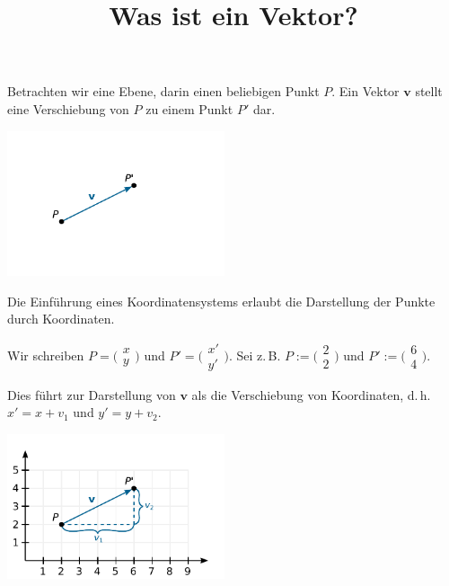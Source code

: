 \documentclass[9pt]{beamer}
\title{Was ist ein Vektor?}
\date{}
\newcommand{\bv}[1]{\mathbf{#1}}
\newcommand{\icol}[1]{
  \big(\!\begin{smallmatrix}#1\end{smallmatrix}\!\big)%
}
\newcommand{\parspace}{\vspace{0.8em}}
\begin{document}
\begin{frame}
\maketitle
\end{frame}

\begin{frame}
Betrachten wir eine Ebene, darin einen beliebigen Punkt $P$. Ein
Vektor $\bv v$ stellt eine Verschiebung von $P$ zu einem Punkt $P'$
dar.\pause

\vspace{-1em}
\begin{center}
\includegraphics[width=64mm]{img/vec-p-pprime.pdf}
\end{center}
\end{frame}

\begin{frame}[t]
\vspace{1em}
Die Einführung eines Koordinatensystems erlaubt die Darstellung der
Punkte durch Koordinaten.

\parspace
Wir schreiben $P=\icol{x\\ y}$ und
$P'=\icol{x'\\ y'}$. Sei z.\,B. $P:=\icol{2\\ 2}$ und $P':=\icol{6\\ 4}$.\pause

\parspace
Dies führt zur Darstellung von $\bv v$ als die Verschiebung von
Koordinaten, d.\,h. $x' = x+v_1$ und $y' = y+v_2$.\pause

\vspace{-1em}
\begin{center}
\includegraphics[width=64mm]{img/vec-p-pprime-coord.pdf}
\end{center}
\end{frame}
\end{document}
